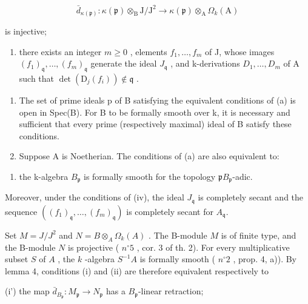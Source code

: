 \[
\bar {d} _ {\kappa (\mathfrak {p})}: \kappa (\mathfrak {p}) \otimes_ {\mathrm{B}} \mathrm{J} / \mathrm{J} ^ {2} \rightarrow \kappa (\mathfrak {p}) \otimes_ {\mathrm{A}} \Omega_ {k} (\mathrm{A})
\]

is injective;

\begin{enumerate}
\def\labelenumi{(\roman{enumi})}
\setcounter{enumi}{3}
\tightlist
\item
  there exists an integer \(m \geqslant 0\) , elements \(f_{1}, \ldots, f_{m}\) of J, whose images \((f_{1})_{\mathfrak{q}}, \ldots, (f_{m})_{\mathfrak{q}}\) generate the ideal \(J_{\mathfrak{q}}\) , and k-derivations \(D_{1}, \ldots, D_{m}\) of A such that \(\det(\mathrm{D}_{j}(f_{i})) \not\in \mathfrak{q}\) .
\end{enumerate}

\begin{enumerate}
\def\labelenumi{\alph{enumi})}
\setcounter{enumi}{1}
\item
  The set of prime ideals p of B satisfying the equivalent conditions of (a) is open in Spec(B). For B to be formally smooth over k, it is necessary and sufficient that every prime (respectively maximal) ideal of B satisfy these conditions.
\item
  Suppose A is Noetherian. The conditions of (a) are also equivalent to:
\end{enumerate}

\begin{enumerate}
\def\labelenumi{(\alph{enumi})}
\setcounter{enumi}{21}
\tightlist
\item
  the k-algebra \(B_{\mathfrak{p}}\) is formally smooth for the topology \(\mathfrak{p}B_{\mathfrak{p}}\)-adic.
\end{enumerate}

Moreover, under the conditions of (iv), the ideal \(J_{\mathfrak{q}}\) is completely secant and the sequence \(((f_{1})_{\mathfrak{q}},\ldots,(f_{m})_{\mathfrak{q}})\) is completely secant for \(A_{\mathfrak{q}}\).

Set \(M = J/J^{2}\) and \(N = B \otimes_{A} \Omega_{k}(A)\) . The B-module \(M\) is of finite type, and the B-module \(N\) is projective ( \(n^{\circ} 5\) , cor. 3 of th. 2). For every multiplicative subset \(S\) of \(A\) , the \(k\) -algebra \(S^{-1}A\) is formally smooth ( \(n^{\circ} 2\) , prop. 4, a)). By lemma 4, conditions (i) and (ii) are therefore equivalent respectively to

(i') the map \(\bar{d}_{B_{\mathfrak{p}}}:M_{\mathfrak{p}}\longrightarrow N_{\mathfrak{p}}\) has a \(B_{\mathfrak{p}}\)-linear retraction;

